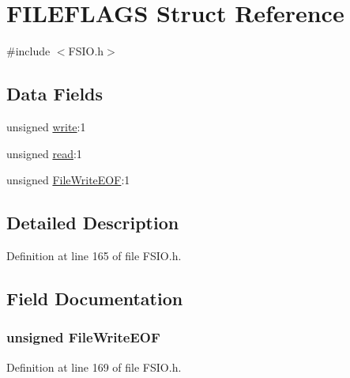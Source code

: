 \hypertarget{struct_f_i_l_e_f_l_a_g_s}{}\section{F\+I\+L\+E\+F\+L\+A\+G\+S Struct Reference}
\label{struct_f_i_l_e_f_l_a_g_s}


{\ttfamily \#include $<$F\+S\+I\+O.\+h$>$}

\subsection*{Data Fields}
\begin{DoxyCompactItemize}
\item 
unsigned \hyperlink{struct_f_i_l_e_f_l_a_g_s_a7f9bd405bd2f03dec58905c3ec5f2964}{write}\+:1
\item 
unsigned \hyperlink{struct_f_i_l_e_f_l_a_g_s_aab11600d260ceda088519026bea9ae68}{read}\+:1
\item 
unsigned \hyperlink{struct_f_i_l_e_f_l_a_g_s_a3f45bcbcd55f9501f7f55c6d112c72be}{File\+Write\+E\+O\+F}\+:1
\end{DoxyCompactItemize}


\subsection{Detailed Description}


Definition at line 165 of file F\+S\+I\+O.\+h.



\subsection{Field Documentation}
\hypertarget{struct_f_i_l_e_f_l_a_g_s_a3f45bcbcd55f9501f7f55c6d112c72be}{}
\subsubsection[{File\+Write\+E\+O\+F}]{\setlength{\rightskip}{0pt plus 5cm}unsigned File\+Write\+E\+O\+F}\label{struct_f_i_l_e_f_l_a_g_s_a3f45bcbcd55f9501f7f55c6d112c72be}


Definition at line 169 of file F\+S\+I\+O.\+h.

\hypertarget{struct_f_i_l_e_f_l_a_g_s_aab11600d260ceda088519026bea9ae68}{}
